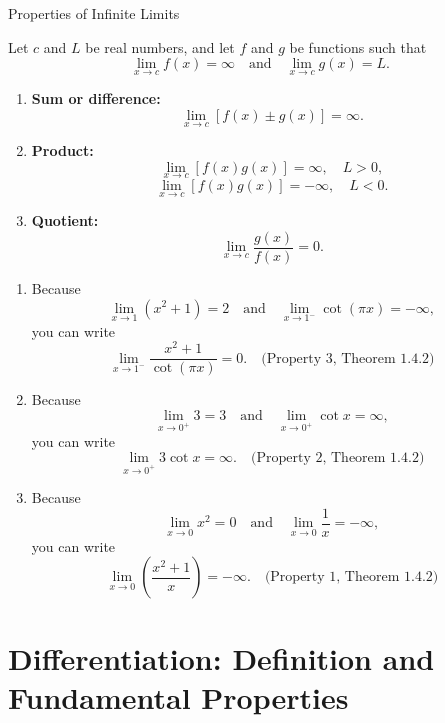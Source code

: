\documentclass[12pt]{article}
\theoremstyle{beautifulthm}
\begin{document}
\begin{mytheorem}{Properties of Infinite Limits}{}

Let $c$ and $L$ be real numbers, and let $f$ and $g$ be functions such that
\[
\lim_{x \to c} f(x) = \infty \quad \text{and} \quad \lim_{x \to c} g(x) = L.
\]

\begin{enumerate}
    \item \textbf{Sum or difference:} 
    \[
    \lim_{x \to c} [f(x) \pm g(x)] = \infty.
    \]

    \item \textbf{Product:} 
    \[
    \lim_{x \to c} [f(x)g(x)] = \infty, \quad L > 0,
    \]
    \[
    \lim_{x \to c} [f(x)g(x)] = -\infty, \quad L < 0.
    \]

    \item \textbf{Quotient:} 
    \[
    \lim_{x \to c} \frac{g(x)}{f(x)} = 0.
    \]
\end{enumerate}


\end{mytheorem}
\begin{tcolorbox}[colback=examplebg, colframe=red!75!black, title=\textbf{EXAMPLE 3: Determining Limits}, fonttitle=\bfseries, sharp corners]

\begin{enumerate}

    \item[\textbf{a.}] Because 
    \[
    \lim_{x \to 1} \left( x^2 + 1 \right) = 2 \quad \text{and} \quad \lim_{x \to 1^-} \cot (\pi x) = -\infty,
    \]
    you can write
    \[
    \lim_{x \to 1^-} \frac{x^2 + 1}{\cot (\pi x)} = 0. \quad \text{(Property 3, Theorem 1.4.2)}
    \]

    \item[\textbf{b.}] Because 
    \[
    \lim_{x \to 0^+} 3 = 3 \quad \text{and} \quad \lim_{x \to 0^+} \cot x = \infty,
    \]
    you can write
    \[
    \lim_{x \to 0^+} 3 \cot x = \infty. \quad \text{(Property 2, Theorem 1.4.2)}
    \]

    \item[\textbf{c.}] Because 
    \[
    \lim_{x \to 0} x^2 = 0 \quad \text{and} \quad \lim_{x \to 0} \frac{1}{x} = -\infty,
    \]
    you can write
    \[
    \lim_{x \to 0} \left( \frac{x^2 + 1}{x} \right) = -\infty. \quad \text{(Property 1, Theorem 1.4.2)}
    \]
\end{enumerate}
\end{tcolorbox}

\section{ Differentiation: Definition and Fundamental Properties}
\newpage
\end{document}
